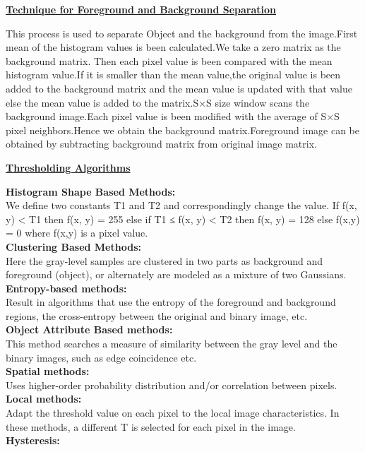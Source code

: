 \documentclass[10pt,a4paper]{article}
\begin{document}
\begin{center}
\underline{\textbf{Technique for Foreground and Background Separation}}
\end{center}
This process is used to separate Object and the background from the image.First mean of the histogram values is been calculated.We take a zero matrix as the background matrix. Then each pixel value is been compared with the mean histogram value.If it is smaller than the mean value,the original value is been added to the background matrix and the mean value is updated with that value else the mean value is added to the matrix.S×S size window scans the background image.Each pixel value is been modified with the average of S×S pixel neighbors.Hence we obtain the background matrix.Foreground image can be obtained by subtracting background matrix from original image matrix.
\begin{center}
\underline{\textbf{Thresholding Algorithms}}
\end{center}
\textbf{Histogram Shape Based Methods:}\\
We define two constants T1 and T2 and correspondingly change the value.
If f(x, y) < T1 then f(x, y) = 255 else if T1 ≤ f(x, y) < T2 then f(x, y) = 128 else f(x,y) = 0 where f(x,y) is a pixel value.\\
\textbf{Clustering Based Methods:}\\
Here the gray-level samples are clustered in two parts as background and foreground (object), or alternately are modeled as a mixture of two Gaussians.\\ 
\textbf{Entropy-based methods:}\\
Result in algorithms that use the entropy of the foreground and background regions, the cross-entropy between the original and binary image, etc.\\
\textbf{Object Attribute Based methods:}\\
This method searches a measure of similarity between the gray level and the binary images, such as edge coincidence etc.\\
\textbf{Spatial methods:}\\
Uses higher-order probability distribution and/or correlation between pixels.\\ 
\textbf{Local methods:}\\
Adapt the threshold value on each pixel to the local image characteristics. In these methods, a diﬀerent T is selected for each pixel in the image.\\ 
\textbf{Hysteresis:} \\
\end{document}
